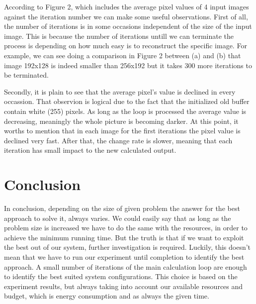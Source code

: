 \documentclass[12pt,a4paper]{article}
\newcommand{\sectionVspacing}{\vspace{15pt}}
\begin{document}
            According to Figure 2, which includes the average pixel values of 4 input images against the iteration number we can make some useful observations. First of all, the number of iterations is in some occasions independent of the size of the input image. This is because the number of iterations untill we can terminate the process is depending on how much easy is to reconstruct the specific image. For example, we can see doing a comparison in Figure 2 between  (a) and (b) that image 192x128 is indeed smaller than 256x192 but it takes 300 more iterations to be terminated.

            Secondly, it is plain to see that the average pixel's value is declined in every occassion. That observion is logical due to the fact that the initialized old buffer contain white (255) pixels. As long as the loop is processed the average value is decreasing, meaningly the whole picture is becoming darker. At this point, it worths to mention that in each image for the first iterations the pixel value is declined very fast. After that, the change rate is slower, meaning that each iteration has small impact to the new calculated output.

\sectionVspacing
\clearpage

\section{Conclusion}
	In conclusion, depending on the size of given problem the answer for the best approach to solve it, always varies. We could easily say that as long as the problem size is increased we have to do the same with the resources, in order to achieve the minimum running time. But the truth is that if we want to exploit the best out of our system, further investigation is required. Luckily, this doesn't mean that we have to run our experiment until completion to identify the best approach. A small number of iterations of the main calculation loop are enough to identify the best suited system configurations. This choice is based on the experiment results, but always taking into account our available resources and budget, which is energy consumption and as always the given time.
\end{document}
